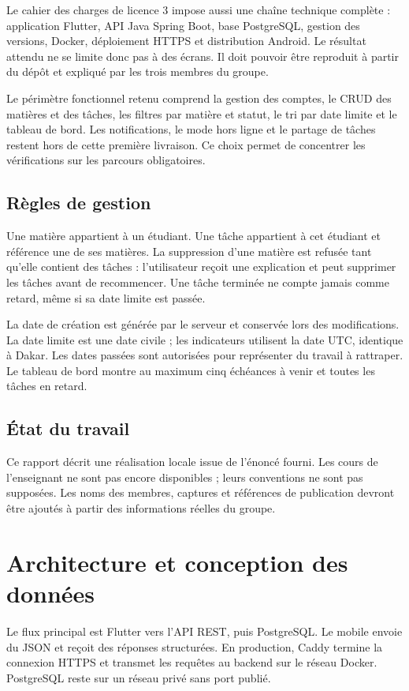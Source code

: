 \documentclass[11pt,a4paper]{article}
\begin{document}
Le cahier des charges de licence 3 impose aussi une chaîne technique complète : application Flutter, API Java Spring Boot, base PostgreSQL, gestion des versions, Docker, déploiement HTTPS et distribution Android. Le résultat attendu ne se limite donc pas à des écrans. Il doit pouvoir être reproduit à partir du dépôt et expliqué par les trois membres du groupe.

Le périmètre fonctionnel retenu comprend la gestion des comptes, le CRUD des matières et des tâches, les filtres par matière et statut, le tri par date limite et le tableau de bord. Les notifications, le mode hors ligne et le partage de tâches restent hors de cette première livraison. Ce choix permet de concentrer les vérifications sur les parcours obligatoires.

\subsection*{Règles de gestion}
Une matière appartient à un étudiant. Une tâche appartient à cet étudiant et référence une de ses matières. La suppression d'une matière est refusée tant qu'elle contient des tâches : l'utilisateur reçoit une explication et peut supprimer les tâches avant de recommencer. Une tâche terminée ne compte jamais comme retard, même si sa date limite est passée.

La date de création est générée par le serveur et conservée lors des modifications. La date limite est une date civile ; les indicateurs utilisent la date UTC, identique à Dakar. Les dates passées sont autorisées pour représenter du travail à rattraper. Le tableau de bord montre au maximum cinq échéances à venir et toutes les tâches en retard.

\subsection*{État du travail}
Ce rapport décrit une réalisation locale issue de l'énoncé fourni. Les cours de l'enseignant ne sont pas encore disponibles ; leurs conventions ne sont pas supposées. Les noms des membres, captures et références de publication devront être ajoutés à partir des informations réelles du groupe.
\newpage
\section{Architecture et conception des données}
Le flux principal est Flutter vers l'API REST, puis PostgreSQL. Le mobile envoie du JSON et reçoit des réponses structurées. En production, Caddy termine la connexion HTTPS et transmet les requêtes au backend sur le réseau Docker. PostgreSQL reste sur un réseau privé sans port publié.
\end{document}
